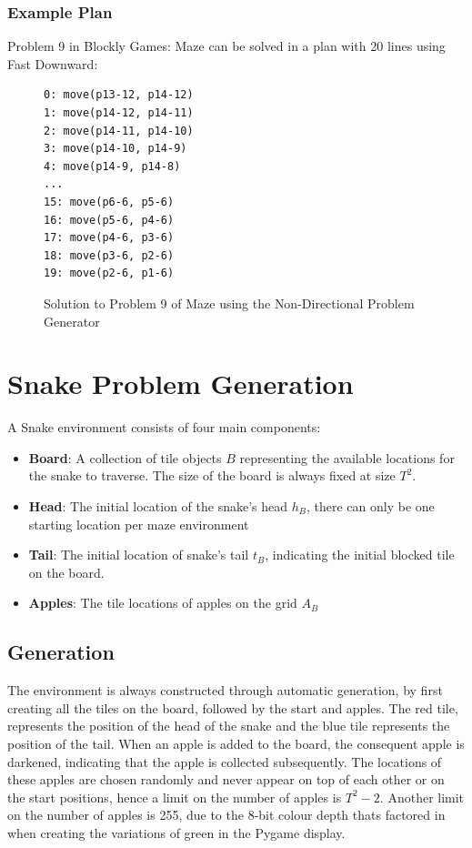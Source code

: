 \subsubsection{Example Plan}
Problem 9 in Blockly Games: Maze can be solved in a plan with 20 lines using Fast Downward:

\begin{figure}[h!]
\centering
\begin{BVerbatim}
0: move(p13-12, p14-12)
1: move(p14-12, p14-11)
2: move(p14-11, p14-10)
3: move(p14-10, p14-9)
4: move(p14-9, p14-8)
...
15: move(p6-6, p5-6)
16: move(p5-6, p4-6)
17: move(p4-6, p3-6)
18: move(p3-6, p2-6)
19: move(p2-6, p1-6)
\end{BVerbatim}
\caption{Solution to Problem 9 of Maze using the Non-Directional Problem Generator}
\end{figure}

\newpage
\section{Snake Problem Generation}
A Snake environment consists of four main components:

\begin{itemize}
    \item \textbf{Board}: A collection of tile objects $B$ representing the available locations for the snake to traverse. The size of the board is always fixed at size $T^2$.
    \item \textbf{Head}: The initial location of the snake's head $h_B$, there can only be one starting location per maze environment
    \item  \textbf{Tail}: The initial location of snake's tail $t_B$, indicating the initial blocked tile on the board.
    \item \textbf{Apples}: The tile locations of apples on the grid $A_B$
\end{itemize}

\subsection{Generation}
The environment is always constructed through automatic generation, by first creating all the tiles on the board, followed by the start and apples. The red tile, represents the position of the head of the snake and the blue tile represents the position of the tail. When an apple is added to the board, the consequent apple is darkened, indicating that the apple is collected subsequently. The locations of these apples are chosen randomly and never appear on top of each other or on the start positions, hence a limit on the number of apples is $T^2 - 2$. Another limit on the number of apples is 255, due to the 8-bit colour depth thats factored in when creating the variations of green in the Pygame display.

